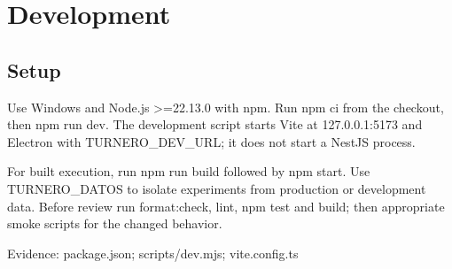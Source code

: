 \section{Development}
\subsection{Setup}

Use Windows and Node.js >=22.13.0 with npm. Run npm ci from the checkout, then npm run dev. The development script starts Vite at 127.0.0.1:5173 and Electron with TURNERO\_DEV\_URL; it does not start a NestJS process.

For built execution, run npm run build followed by npm start. Use TURNERO\_DATOS to isolate experiments from production or development data. Before review run format:check, lint, npm test and build; then appropriate smoke scripts for the changed behavior.

Evidence: package.json; scripts/dev.mjs; vite.config.ts

